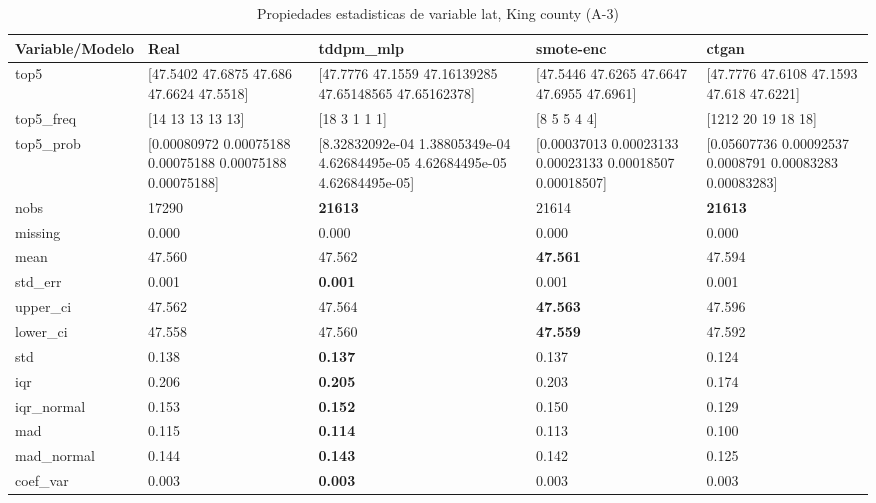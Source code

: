 \begin{table}[H]
\centering
\fontsize{8}{14}\selectfont
\caption{Propiedades  estadisticas de variable lat, King county (A-3)}
\label{table-stats-king county-a-3-lat}
\begin{tabular}{|l|m{10em}|m{10em}|m{10em}|m{10em}|}
\hline
 \rowcolor[gray]{0.8}
Variable/Modelo & Real & tddpm\_mlp & smote-enc & ctgan \\
\hline top5 & [47.5402 47.6875 47.686  47.6624 47.5518] & [47.7776     47.1559     47.16139285 47.65148565 47.65162378] & [47.5446 47.6265 47.6647 47.6955 47.6961] & [47.7776 47.6108 47.1593 47.618  47.6221] \\
\hline top5\_freq & [14 13 13 13 13] & [18  3  1  1  1] & [8 5 5 4 4] & [1212   20   19   18   18] \\
\hline top5\_prob & [0.00080972 0.00075188 0.00075188 0.00075188 0.00075188] & [8.32832092e-04 1.38805349e-04 4.62684495e-05 4.62684495e-05
 4.62684495e-05] & [0.00037013 0.00023133 0.00023133 0.00018507 0.00018507] & [0.05607736 0.00092537 0.0008791  0.00083283 0.00083283] \\
\hline nobs & 17290 & \bfseries 21613 & \cellcolor[rgb]{0.9, 0.54, 0.52} 21614 & \bfseries 21613 \\
\hline missing & 0.000 & 0.000 & 0.000 & 0.000 \\
\hline mean & 47.560 & 47.562 & \bfseries 47.561 & \cellcolor[rgb]{0.9, 0.54, 0.52} 47.594 \\
\hline std\_err & 0.001 & \bfseries 0.001 & 0.001 & \cellcolor[rgb]{0.9, 0.54, 0.52} 0.001 \\
\hline upper\_ci & 47.562 & 47.564 & \bfseries 47.563 & \cellcolor[rgb]{0.9, 0.54, 0.52} 47.596 \\
\hline lower\_ci & 47.558 & 47.560 & \bfseries 47.559 & \cellcolor[rgb]{0.9, 0.54, 0.52} 47.592 \\
\hline std & 0.138 & \bfseries 0.137 & 0.137 & \cellcolor[rgb]{0.9, 0.54, 0.52} 0.124 \\
\hline iqr & 0.206 & \bfseries 0.205 & 0.203 & \cellcolor[rgb]{0.9, 0.54, 0.52} 0.174 \\
\hline iqr\_normal & 0.153 & \bfseries 0.152 & 0.150 & \cellcolor[rgb]{0.9, 0.54, 0.52} 0.129 \\
\hline mad & 0.115 & \bfseries 0.114 & 0.113 & \cellcolor[rgb]{0.9, 0.54, 0.52} 0.100 \\
\hline mad\_normal & 0.144 & \bfseries 0.143 & 0.142 & \cellcolor[rgb]{0.9, 0.54, 0.52} 0.125 \\
\hline coef\_var & 0.003 & \bfseries 0.003 & 0.003 & \cellcolor[rgb]{0.9, 0.54, 0.52} 0.003 \\

\end{tabular}
\end{table}
